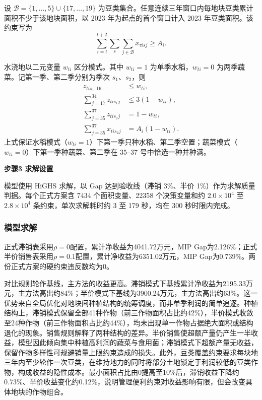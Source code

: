 设 $\mathcal B=\{1,\dots,5\}\cup\{17,\dots,19\}$ 为豆类集合。任意连续三年窗口内每地块豆类累计面积不少于该地块面积，以 2023 年为起点的首个窗口计入 2023 年豆类面积。该约束写为
\begin{equation}
\sum_{\tau=t}^{t+2}\sum_s\sum_{j\in\mathcal B}x_{\tau isj}\ge A_i.
\end{equation}

水浇地以二元变量 $w_{ti}$ 区分模式。其中 $w_{ti}=1$ 为单季水稻，$w_{ti}=0$ 为两季蔬菜。记第一季、第二季分别为季次 $s_1$、$s_2$，则
\begin{align}
z_{tis_1,16}&\le w_{ti},\\
\sum_{j=17}^{34}z_{tis_1 j}&\le3(1-w_{ti}),\\
\sum_{j=35}^{37}z_{tis_2 j}&=1-w_{ti},\\
\sum_{j=35}^{37}x_{tis_2 j}&=A_i(1-w_{ti}).
\end{align}
上式保证水稻模式（$w_{ti}=1$）下第一季只种水稻、第二季空置；蔬菜模式（$w_{ti}=0$）下第一季种蔬菜、第二季在 $35$--$37$ 号中恰选一种并种满。

\textbf{步骤3 求解设置}

模型使用 HiGHS 求解，以 Gap 达到验收线（滞销 3\%、半价 1\%）作为求解质量判据。每个正式方案含 7434 个面积变量、22358 个决策变量和约 $2.0\times10^4$ 至 $2.8\times10^4$ 条约束，单次求解耗时约 3 至 179 秒，均在 300 秒时限内完成。

\subsubsection{模型求解}

正式滞销表采用$\rho=0$配置，累计净收益为4041.72万元，MIP Gap为2.126\%；正式半价销售表采用$\rho=0.1$配置，累计净收益为6351.02万元，MIP Gap为0.739\%。两份正式方案的硬约束违反数均为0。

对比规则轮作基线，主方法的收益更高。滞销模式下基线累计净收益为2195.33万元，主方法高出约84\%；半价模式下基线为3900.24万元，主方法高出约63\%。这一优势来自全局优化对地块间种植结构的统筹调度，而非单季利润的简单追逐。种植结构上，滞销模式保留全部41种作物（前三作物面积占比约42\%），半价模式收敛至24种作物（前三作物面积占比约44\%），均未出现单一作物占据绝大面积或结构退化的现象。销售规则解释了两种结构的差异。半价销售使超额产量仍产生一半收益，模型因此倾向集中种植高利润的蔬菜与食用菌；滞销模式下超额产量无收益，保留作物多样性可规避销量上限约束造成的损失。此外，豆类覆盖约束要求每块地三年内至少轮作一次豆类，在维持地力的同时将部分土地锁定于利润较低的豆类作物，构成收益的隐性成本。最小面积占比由0提高至10\%后，滞销收益下降约0.73\%、半价收益变化约0.12\%，说明管理便利约束对收益影响有限，但会改变具体地块的作物组合。

